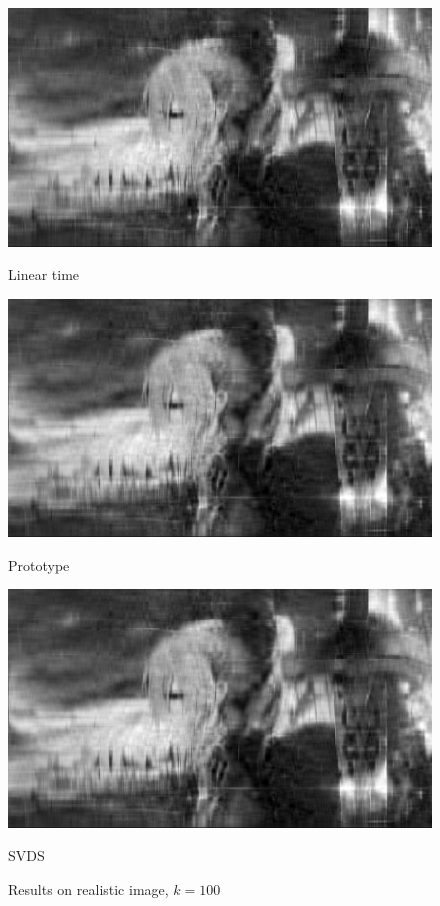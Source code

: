 \documentclass{article}
\begin{document}
\begin{figure}[p]
	\begin{minipage}{0.33\linewidth}
		\centering
		\includegraphics[width=1\linewidth]{./fig/image_rec41.jpeg}
		\caption{Linear time}
	\end{minipage}
	\begin{minipage}{0.33\linewidth}
		\centering
		\includegraphics[width=1\linewidth]{./fig/image_rec42.jpeg}
		\caption{Prototype}
	\end{minipage}
    \begin{minipage}{0.33\linewidth}
		\centering
		\includegraphics[width=1\linewidth]{./fig/image_rec43.jpeg}
		\caption{SVDS }
	\end{minipage}
	\caption*{Results on realistic image, $k=100$}
\end{figure} 
\end{document}

